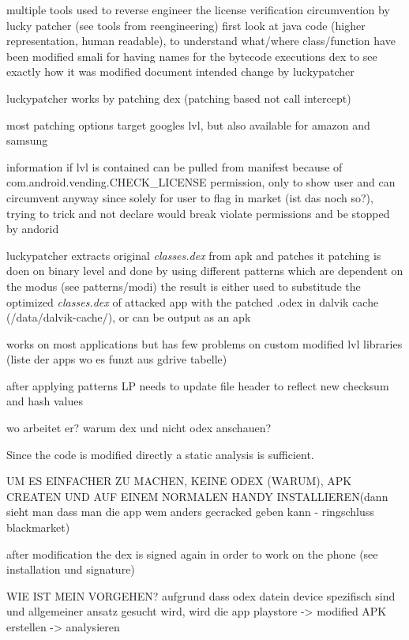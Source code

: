 multiple tools used to reverse engineer the license verification circumvention by lucky patcher (see tools from reengineering)
first look at java code (higher representation, human readable), to understand what/where class/function have been modified
smali for having names for the bytecode executions
dex to see exactly how it was modified
document intended change by luckypatcher

luckypatcher works by patching dex (patching based not call intercept)

most patching options target googles lvl, but also available for amazon and samsung

information if lvl is contained can be pulled from manifest because of com.android.vending.CHECK\_LICENSE permission, only to show user and can circumvent anyway since solely for user to flag in market (ist das noch so?), trying to trick and not declare would break violate permissions and be stopped by andorid

luckypatcher extracts original \textit{classes.dex} from apk and patches it
patching is doen on binary level and done by using different patterns which are dependent on the modus (see patterns/modi)
the result is either used to substitude the optimized \textit{classes.dex} of attacked app with the patched .odex in dalvik cache (/data/dalvik-cache/), or can be output as an apk

works on most applications but has few problems on custom modified lvl libraries (liste der apps wo es funzt aus gdrive tabelle)

after applying patterns LP needs to update file header to reflect new checksum and hash values

\cite{munteanLicense}
%

wo arbeitet er?\newline
warum dex und nicht odex anschauen?\newline

Since the code is modified directly a static analysis is sufficient.\newline

UM ES EINFACHER ZU MACHEN, KEINE ODEX (WARUM), APK CREATEN UND AUF EINEM NORMALEN HANDY INSTALLIEREN(dann sieht man dass man die app wem anders gecracked geben kann - ringschluss blackmarket)\newline

after modification the dex is signed again in order to work on the phone (see installation und signature)

WIE IST MEIN VORGEHEN?
aufgrund dass odex datein device spezifisch sind und allgemeiner ansatz gesucht wird, wird die
app playstore -> modified APK erstellen -> analysieren

